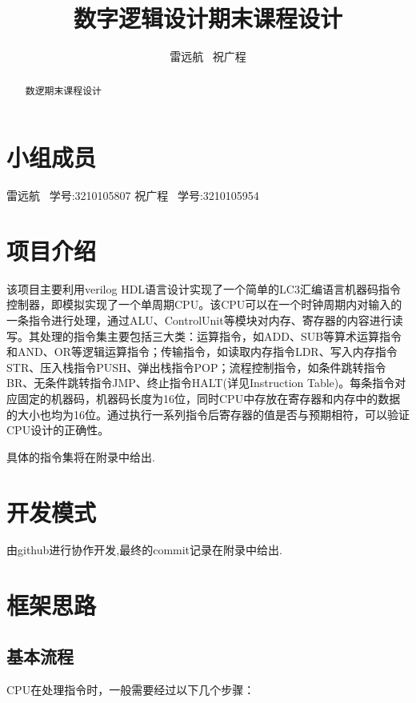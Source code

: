 \documentclass{article}
\title{数字逻辑设计期末课程设计}
\author{雷远航 \ 祝广程}
\begin{document}
\setcounter{tocdepth}{5}  %



\maketitle

\begin{abstract}
数逻期末课程设计


\end{abstract}


\tableofcontents
\newpage



\section{小组成员}
雷远航   \ 学号:3210105807
祝广程   \ 学号:3210105954


\section{项目介绍}
该项目主要利用verilog HDL语言设计实现了一个简单的LC3汇编语言机器码指令控制器，即模拟实现了一个单周期CPU。该CPU可以在一个时钟周期内对输入的一条指令进行处理，通过ALU、ControlUnit等模块对内存、寄存器的内容进行读写。其处理的指令集主要包括三大类：运算指令，如ADD、SUB等算术运算指令和AND、OR等逻辑运算指令；传输指令，如读取内存指令LDR、写入内存指令STR、压入栈指令PUSH、弹出栈指令POP；流程控制指令，如条件跳转指令BR、无条件跳转指令JMP、终止指令HALT(详见Instruction Table)。每条指令对应固定的机器码，机器码长度为16位，同时CPU中存放在寄存器和内存中的数据的大小也均为16位。通过执行一系列指令后寄存器的值是否与预期相符，可以验证CPU设计的正确性。

具体的指令集将在附录中给出.


\section{开发模式}
由github进行协作开发,最终的commit记录在附录中给出.

\section{框架思路}

\subsection{基本流程}
CPU在处理指令时，一般需要经过以下几个步骤： 
\end{document}
